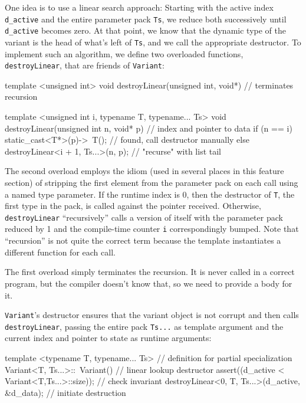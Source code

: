One idea is to use a linear search approach: Starting with the active
index \lstinline!d_active! and the entire parameter pack \lstinline!Ts!, we
reduce both successively until \lstinline!d_active! becomes zero. At that
point, we know that the dynamic type of the variant is the head of
what's left of \lstinline!Ts!, and we call the appropriate destructor. To
implement such an algorithm, we define two overloaded functions,
\lstinline!destroyLinear!, that are friends of \lstinline!Variant!:

\begin{emcppslisting}[emcppsbatch={e38,e39}]
template <unsigned int>
void destroyLinear(unsigned int, void*) { }  // terminates recursion

template <unsigned int i, typename T, typename... Ts>
void destroyLinear(unsigned int n, void* p)  // index and pointer to data
{
    if (n == i)
        static_cast<T*>(p)->~T();            // found, call destructor manually
    else
        destroyLinear<i + 1, Ts...>(n, p);   // "recurse" with list tail
}
\end{emcppslisting}
    

\noindent The second overload employs the idiom (used in several places in this
feature section) of stripping the first element from the parameter pack
on each call using a named type parameter. If the runtime index is 0,
then the destructor of \lstinline!T!, the first type in the pack, is called
against the pointer received. Otherwise, \lstinline!destroyLinear!
``recursively'' calls a version of itself with the parameter pack
reduced by 1 and the compile-time counter \lstinline!i! correspondingly
bumped. Note that ``recursion'' is not quite the correct term because
the template instantiates a different function for each call.

The first overload simply terminates the recursion. It is never called
in a correct program, but the compiler doesn't know that, so we need to
provide a body for it.

\lstinline!Variant!'s destructor ensures that the variant object is not
corrupt and then calls\linebreak%
\lstinline!destroyLinear!, passing the entire pack
\lstinline!Ts...! as template argument and the current index and pointer to
state as runtime arguments:

\begin{emcppslisting}[emcppsbatch=e38]
template <typename T, typename... Ts>  // definition for partial specialization
Variant<T, Ts...>::~Variant()          // linear lookup destructor
{
    assert((d_active < Variant<T,Ts...>::size));    // check invariant
    destroyLinear<0, T, Ts...>(d_active, &d_data);  // initiate destruction
}
\end{emcppslisting}
    

